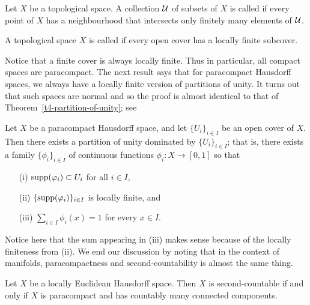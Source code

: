\begin{defn}
  Let $X$ be a topological space. A collection $\mathcal{U}$ of subsets of $X$ is called  if every point of $X$ has a neighbourhood that intersects only finitely many elements of $\mathcal{U}$.
\end{defn}
\begin{defn}
  A topological space $X$ is called  if every open cover has a locally finite subcover.
\end{defn}
Notice that a finite cover is always locally finite. Thus in particular, all compact spaces are paracompact. The next result says that for paracompact Hausdorff spaces, we always have a locally finite version of partitions of unity. It turns out that such spaces are normal \cite[Thm.~41.1]{Mun} and so the proof is almost identical to that of Theorem~\ref{t4-partition-of-unity}; see \cite[Thm.~41.7]{Mun}
\begin{thm}
  Let $X$ be a paracompact Hausdorff space, and let $\{U_i\}_{i \in I}$ be an open cover of $X$. Then there exists a partition of unity dominated by $\{U_i\}_{i \in I}$; that is, there exists a family $\{\phi_i\}_{i \in I}$ of continuous functions $\phi_i : X \to [0, 1]$ so that
  \begin{itemize}
    \item[(i)] $\operatorname{supp}(\varphi_i) \subset U_i$ for all $i \in I$,
    \item[(ii)] $\{\operatorname{supp}(\varphi_i)\}_{i \in I}$ is locally finite, and
    \item[(iii)] $\sum_{i \in I} \phi_i(x) = 1$ for every $x \in I$.
  \end{itemize}
\end{thm}
Notice here that the sum appearing in (iii) makes sense because of the locally finiteness from (ii). We end our discussion by noting that in the context of manifolds, paracompactness and second-countability is almost the same thing.
\begin{thm}
  Let $X$ be a locally Euclidean Hausdorff space. Then $X$ is second-countable if and only if $X$ is paracompact and has countably many connected components.
\end{thm}
